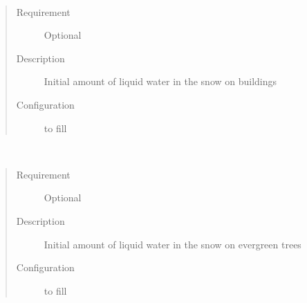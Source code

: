 \documentclass[letterpaper,10pt,english]{sphinxmanual}
\begin{document}

\begin{fulllineitems}
\label{\detokenize{input_files/Initial_Conditions/Snow_related_parameters:cmdoption-arg-snowwaterbldgsstate}}~\begin{quote}\begin{description}
\item[{Requirement}] \leavevmode
Optional

\item[{Description}] \leavevmode
Initial amount of liquid water in the snow on buildings

\item[{Configuration}] \leavevmode
to fill

\end{description}\end{quote}

\end{fulllineitems}


\begin{fulllineitems}
\label{\detokenize{input_files/Initial_Conditions/Snow_related_parameters:cmdoption-arg-snowwaterevetrstate}}~\begin{quote}\begin{description}
\item[{Requirement}] \leavevmode
Optional

\item[{Description}] \leavevmode
Initial amount of liquid water in the snow on evergreen trees

\item[{Configuration}] \leavevmode
to fill

\end{description}\end{quote}

\end{fulllineitems}

\end{document}
